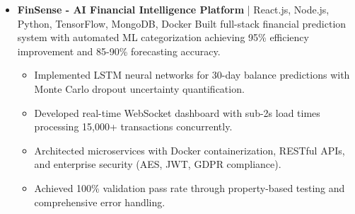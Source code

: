 \documentclass[11pt]{article}
\begin{document}
\begin{itemize}[leftmargin=*]

\item \textbf{FinSense - AI Financial Intelligence Platform} | React.js, Node.js, Python, TensorFlow, MongoDB, Docker
Built full-stack financial prediction system with automated ML categorization achieving 95\% efficiency improvement and 85-90\% forecasting accuracy.
\begin{itemize}
\item Implemented LSTM neural networks for 30-day balance predictions with Monte Carlo dropout uncertainty quantification.
\item Developed real-time WebSocket dashboard with sub-2s load times processing 15,000+ transactions concurrently.
\item Architected microservices with Docker containerization, RESTful APIs, and enterprise security (AES, JWT, GDPR compliance).
\item Achieved 100\% validation pass rate through property-based testing and comprehensive error handling.
\end{itemize}

\end{itemize}
\end{document}
